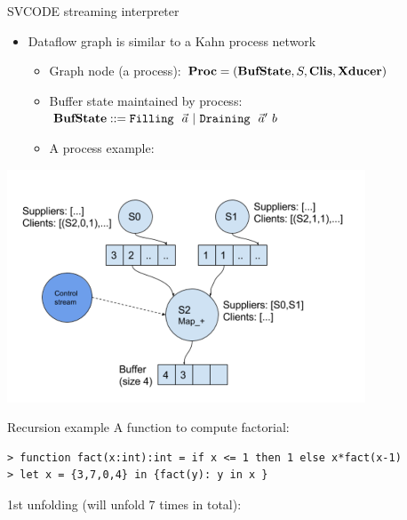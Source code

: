 \documentclass{beamer}
\begin{document}
\begin{frame}{SVCODE streaming interpreter}
	\begin{itemize}
	\item Dataflow graph is similar to a Kahn process network
	\begin{itemize}
		\item Graph node (a process): $\mathbf{Proc}   =  (\mathbf{BufState}, S, \mathbf{Clis}, \mathbf{Xducer})$
		\item Buffer state maintained by process: $\bufst ::= \filling \ \a  \ | \ \draining \ \a' \ b$ 
		\item A process example: 
	\end{itemize}

	\end{itemize}
	\includegraphics[width=0.8\textwidth]{../process2}
\end{frame}


\begin{frame}[fragile]{Recursion example}
A function to compute factorial:
\begin{lstlisting}[style=nesl-style]
> function fact(x:int):int = if x <= 1 then 1 else x*fact(x-1)
> let x = {3,7,0,4} in {fact(y): y in x }
\end{lstlisting}

1st unfolding (will unfold 7 times in total):
	
    
\end{frame}


\def\fmsnesl{SNESL\textsubscript{0}}
\def\fmsvcode{SVCODE\textsubscript{0}}

\def\seval#1#2#3#4#5{\left\langle#1,#2 \right\rangle \Da^{#3} #4 \ \$ \ #5} 
\def\sevalf#1#2#3#4{{\lcall}(#1,...,#2) \Da^{#3} #4}
\def\sevalfg#1#2#3#4{#1(#2) \Da^{#3} #4}
\def\Eval#1#2#3#4{#1 \Env #2 \Eva #3 \ \$ \ #4 } 
\def\Type#1#2#3{#1 \Env #2 : #3 } 
\def\Typef#1#2#3{#1 : (#2) \rightarrow #3}
\def\TypeV#1#2{#1 : #2}
\def\ValRep#1#2#3{ #1 \mathrel{\triangleright_{#2}} #3}
\newcommand{\blocke}[3]{\lcall(#1,...,#2) \Eva #3}
\end{document}
